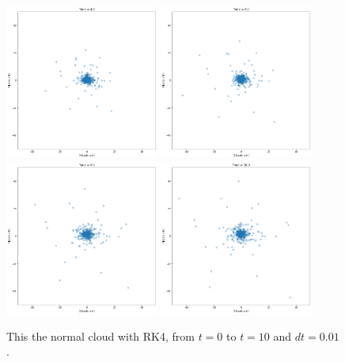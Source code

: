 \documentclass[12pt]{article}
\begin{document}
    \begin{figure}[H]
        \centering 
        \includegraphics[width = 0.45\textwidth]{./RK4/4.png}  
        \includegraphics[width = 0.45\textwidth]{./RK4/6.png}
        \includegraphics[width = 0.45\textwidth]{./RK4/8.png}
        \includegraphics[width = 0.45\textwidth]{./RK4/10.png} 
        \caption{This the normal cloud with RK4, from $t=0$ to $t=10$ and $dt=0.01$.}
        \label{RK4_cloud}
    \end{figure}
\end{document}
